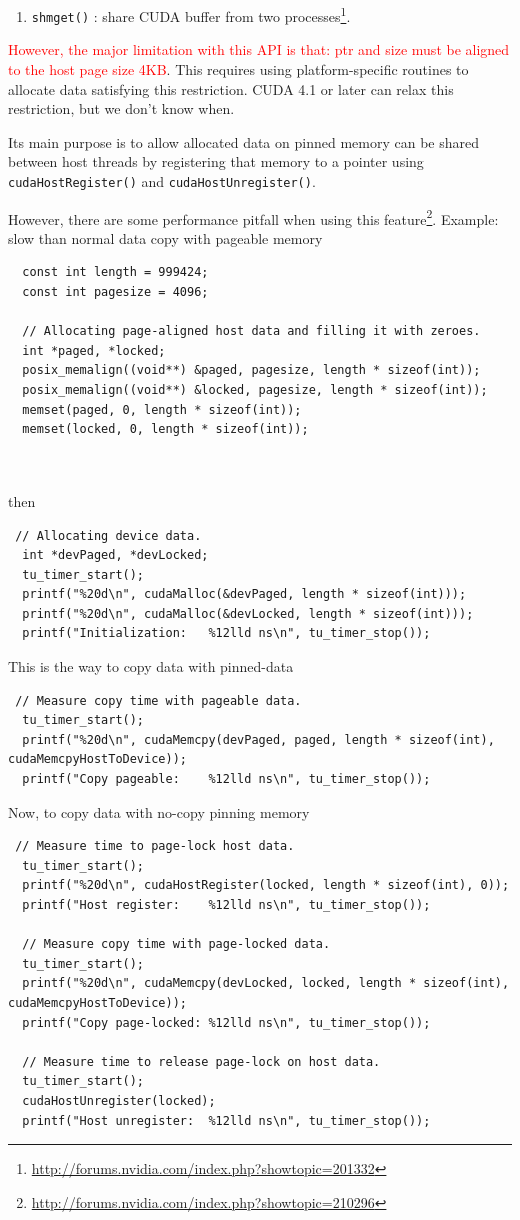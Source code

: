 \begin{enumerate}
\begin{enumerate}
  \item \verb!shmget()! : share CUDA buffer from two
  processes\footnote{\url{http://forums.nvidia.com/index.php?showtopic=201332}}.
  \end{enumerate}
\textcolor{red}{However, the major limitation with this API is that: ptr and
size must be aligned to the host page size 4KB}. This requires using
platform-specific routines to allocate data satisfying this restriction. CUDA
4.1 or later can relax this restriction, but we don't know when.
\end{enumerate}

Its main purpose is to allow allocated data on pinned memory can be shared
between host threads by registering that memory to a pointer using \verb!cudaHostRegister()! and
\verb!cudaHostUnregister()!. 


However, there are some performance pitfall when using this
feature\footnote{\url{http://forums.nvidia.com/index.php?showtopic=210296}}.
Example: slow than normal data copy with pageable memory
\begin{lstlisting}
  const int length = 999424;
  const int pagesize = 4096;

  // Allocating page-aligned host data and filling it with zeroes.
  int *paged, *locked;
  posix_memalign((void**) &paged, pagesize, length * sizeof(int));
  posix_memalign((void**) &locked, pagesize, length * sizeof(int));
  memset(paged, 0, length * sizeof(int));
  memset(locked, 0, length * sizeof(int));
  
  
\end{lstlisting}
then
\begin{lstlisting}
 // Allocating device data.
  int *devPaged, *devLocked;
  tu_timer_start();
  printf("%20d\n", cudaMalloc(&devPaged, length * sizeof(int)));
  printf("%20d\n", cudaMalloc(&devLocked, length * sizeof(int)));
  printf("Initialization:   %12lld ns\n", tu_timer_stop());
\end{lstlisting}
This is the way to copy data with pinned-data
\begin{lstlisting}
 // Measure copy time with pageable data.
  tu_timer_start();
  printf("%20d\n", cudaMemcpy(devPaged, paged, length * sizeof(int), cudaMemcpyHostToDevice));
  printf("Copy pageable:    %12lld ns\n", tu_timer_stop());
\end{lstlisting}
Now, to copy data with no-copy pinning memory
\begin{lstlisting}
 // Measure time to page-lock host data.
  tu_timer_start();
  printf("%20d\n", cudaHostRegister(locked, length * sizeof(int), 0));
  printf("Host register:    %12lld ns\n", tu_timer_stop());

  // Measure copy time with page-locked data.
  tu_timer_start();
  printf("%20d\n", cudaMemcpy(devLocked, locked, length * sizeof(int), cudaMemcpyHostToDevice));
  printf("Copy page-locked: %12lld ns\n", tu_timer_stop());

  // Measure time to release page-lock on host data.
  tu_timer_start();
  cudaHostUnregister(locked);
  printf("Host unregister:  %12lld ns\n", tu_timer_stop());  
\end{lstlisting}

